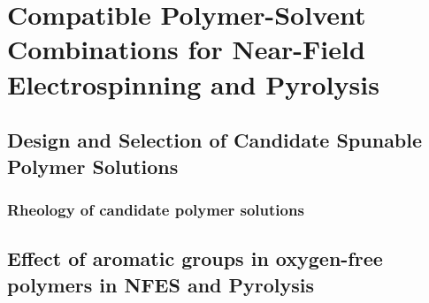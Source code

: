 
\chapter{Compatible Polymer-Solvent Combinations for Near-Field Electrospinning and Pyrolysis} %

\label{Chapter:4}

\section{Design and Selection of Candidate Spunable Polymer Solutions}



\subsection{Rheology of candidate polymer solutions}



\section{Effect of aromatic groups in oxygen-free polymers in NFES and Pyrolysis}



